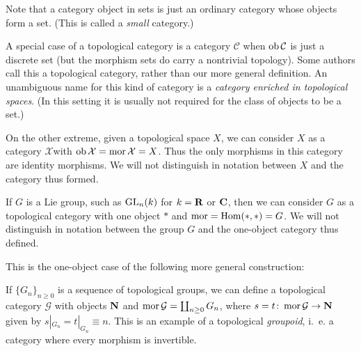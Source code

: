 \documentclass[a4paper,openany]{scrbook}
\renewcommand{\C}{\mathcal C}
\begin{document}
Note that a category object in sets is just an ordinary category whose objects form a set. (This is called a \emph{small} category.)

A special case of a topological category is a category $\C$ when $\ob\C$ is just a discrete set (but the morphism sets do carry a nontrivial topology). Some authors call this a topological category, rather than our more general definition. An unambiguous name for this kind of category is a \emph{category enriched in topological spaces}. (In this setting it is usually not required for the class of objects to be a set.)

On the other extreme, given a topological space $X$, we can consider $X$ as a category $\mathcal X$with $\operatorname{ob} \mathcal X = \operatorname{mor} \mathcal X = X$. Thus the only morphisms in this category are identity morphisms. We will not distinguish in notation between $X$ and the category thus formed.

\begin{example}
If $G$ is a Lie group, such as $\operatorname{GL}_n(k)$ for $k=\mathbf R$ or $\mathbf C$, then we can consider $G$ as a topological category with one object $*$ and $\operatorname{mor} = \operatorname{Hom}(*,*) = G$. We will not distinguish in notation between the group $G$ and the one-object category thus defined.
\end{example}

This is the one-object case of the following more general construction:

\begin{example}
If $\{G_n\}_{n \geq 0}$ is a sequence of topological groups, we can define a topological category $\mathcal G$ with objects $\mathbf{N}$ and $\operatorname{mor} \mathcal G = \coprod_{n \geq 0} G_n$, where $s=t\colon \operatorname{mor} \mathcal G \to \mathbf{N}$ given by $s|_{G_n} = t|_{G_n} \equiv n$. This is an example of a topological \emph{groupoid}, i.~e. a category where every morphism is invertible. 
\end{example}
\end{document}
